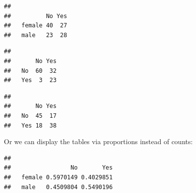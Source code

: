 \documentclass[
]{book}
\newenvironment{Shaded}{\begin{snugshade}}{\end{snugshade}}
\newcommand{\DecValTok}[1]{\textcolor[rgb]{0.00,0.00,0.81}{#1}}
\newcommand{\DocumentationTok}[1]{\textcolor[rgb]{0.56,0.35,0.01}{\textbf{\textit{#1}}}}
\newcommand{\FunctionTok}[1]{\textcolor[rgb]{0.13,0.29,0.53}{\textbf{#1}}}
\newcommand{\NormalTok}[1]{#1}
\newcommand{\SpecialCharTok}[1]{\textcolor[rgb]{0.81,0.36,0.00}{\textbf{#1}}}
\begin{document}
\begin{verbatim}
##         
##          No Yes
##   female 40  27
##   male   23  28
\end{verbatim}

\begin{Shaded}
\end{Shaded}

\begin{verbatim}
##      
##       No Yes
##   No  60  32
##   Yes  3  23
\end{verbatim}

\begin{Shaded}
\end{Shaded}

\begin{verbatim}
##      
##       No Yes
##   No  45  17
##   Yes 18  38
\end{verbatim}

Or we can display the tables via proportions instead of counts:

\begin{Shaded}
\end{Shaded}

\begin{verbatim}
##         
##                 No       Yes
##   female 0.5970149 0.4029851
##   male   0.4509804 0.5490196
\end{verbatim}

\begin{Shaded}
\end{Shaded}
\end{document}
